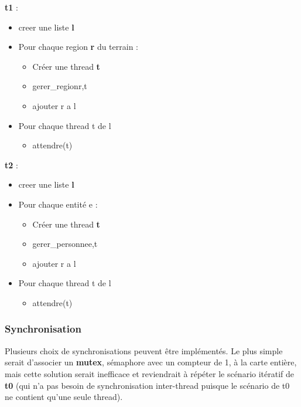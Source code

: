 \documentclass[11pt]{article} %
\begin{document}
\textbf{t1} :
\begin{itemize}
\item creer une liste \textbf{l}
\item Pour chaque region \textbf{r} du terrain :
	\begin{itemize}
		\item Créer une  thread \textbf{t}
		\item gerer\_region{r,t}
		\item ajouter r a l
	\end{itemize}

\item Pour chaque thread t de l
\begin{itemize}
		\item attendre(t)
	\end{itemize}

\end{itemize} 
 
\textbf{t2} :
\begin{itemize}
\item creer une liste \textbf{l}
\item Pour chaque entité e :
	\begin{itemize}
		\item Créer une  thread \textbf{t}
		\item gerer\_personne{e,t}
		\item  ajouter r a l
	\end{itemize}

\item Pour chaque thread t de l
\begin{itemize}
		\item attendre(t)
	\end{itemize}

\end{itemize}

\subsubsection{Synchronisation}

Plusieurs choix de synchronisations peuvent être implémentés. Le plus simple serait d'associer un \textbf{mutex}, sémaphore avec un compteur de 1, à la carte entière, mais cette solution serait inefficace et reviendrait à répéter le scénario itératif de \textbf{t0} (qui n'a pas besoin de synchronisation inter-thread puisque le scénario de t0 ne contient qu'une seule thread).
\end{document}
